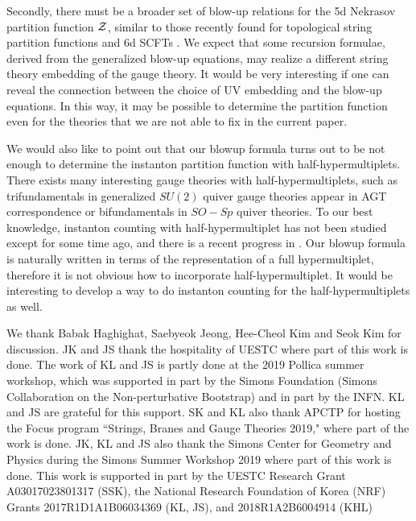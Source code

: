 \documentclass[letterpaper, 11pt]{article}
\def\CZ{{\cal Z}}
\begin{document}
{Secondly, there must be a broader set of blow-up relations for the 5d Nekrasov partition function $\CZ$, similar to those recently found for topological string partition functions and 6d SCFTs \cite{Grassi:2016nnt, Gu:2017ccq, Huang:2017mis, Gu:2018gmy,Gu:2019dan}. We expect that some recursion formulae, derived from the generalized blow-up equations, may realize a different string theory embedding of the gauge theory. It would be very interesting if one can reveal the connection between the choice of UV embedding and the blow-up equations. In this way, it may be possible to determine the partition function even for the theories that we are not able to fix in the current paper. 

We would also like to point out that our blowup formula turns out to be not enough to determine the instanton partition function with half-hypermultiplets. There exists many interesting gauge theories with half-hypermultiplets, such as trifundamentals in generalized $SU(2)$ quiver gauge theories \cite{Gaiotto:2009we} appear in AGT correspondence \cite{Alday:2009aq} or bifundamentals in $SO-Sp$ quiver theories. To our best knowledge, instanton counting with half-hypermultiplet has not been studied except for \cite{Hollands:2010xa, Hollands:2011zc} some time ago, and there is a recent progress in \cite{Coman:2019eex}. Our blowup formula is naturally written in terms of the representation of a full hypermultiplet, therefore it is not obvious how to incorporate half-hypermultiplet. It would be interesting to develop a way to do instanton counting for the half-hypermultiplets as well. 


\acknowledgments
We thank Babak Haghighat, Saebyeok Jeong, Hee-Cheol Kim and Seok Kim for discussion. 
JK and JS thank the hospitality of UESTC where part of this work is done. 
The work of KL and JS is partly done at the 2019 Pollica summer workshop, which was supported in part by the Simons Foundation (Simons Collaboration on the Non-perturbative Bootstrap) and in part by the INFN. KL and JS are grateful for this support.
SK and KL also thank APCTP for hosting the Focus program ``Strings, Branes and Gauge Theories 2019," where part of the work is done.
JK, KL and JS also thank the Simons Center for Geometry and Physics during the Simons Summer Workshop 2019 where part of this work is done. 
This work is supported in part by the UESTC Research Grant A03017023801317 (SSK), the National Research Foundation of Korea (NRF) Grants 2017R1D1A1B06034369 (KL, JS), and 2018R1A2B6004914 (KHL)

}
\end{document}

